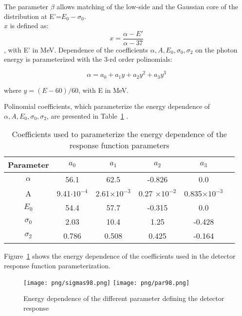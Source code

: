 The parameter $\beta$  allows matching of the low-side and the Gaussian core
of the distribution at E'=$E_0-\sigma_0$.\\
$x$ is defined as:
$$
  x = \frac{\alpha- E'}{\alpha -37} 
$$, with E' in MeV.
Dependence of the coefficients $\alpha, A, E_0, \sigma_0, \sigma_2$ on the photon energy
is parameterized with the 3-rd order polinomials:

\begin{equation}
  \alpha= a_0+a_1y+a_2y^2+a_3y^3
\end{equation}

where $y= (E-60)/60$, with E in MeV.

Polinomial coefficients, which parameterize the energy dependence of
$\alpha, A, E_0, \sigma_0, \sigma_2$, are presented in Table~\ref{tab:param98} .

\begin{table}[!h] \label{tab:param98}
  \begin{center}
    \begin{tabular}{| c | c | c | c | c | c | }
      \hline
      Parameter  & $a_0$              & $a_1$ & $a_2$ & $a_3$ \\ \hline
      $\alpha$   & 56.1               &62.5 & -0.826 & 0.0  \\ \hline
      A          & 9.41$\cdot 10^{-4}$ & 2.61$\times 10^{-3}$ &0.27 $\times 10^{-2}$ &0.835$\times 10^{-3}$   \\ \hline
      $E_0$      & 54.4               & 57.7 & -0.315 &0.0 \\ \hline
      $\sigma_0$ & 2.03               &10.4 &1.25 & -0.428\\ \hline
      $\sigma_2$ & 0.786              & 0.508 & 0.425 & -0.164\\ \hline
    \end{tabular}
  \end{center}
  \caption{Coefficients used to parameterize the energy dependence of the response function parameters}
\end{table}

Figure~\ref{fig:parameters98} shows the energy dependence of the coefficients used
in the detector response function parameterization.

\begin{figure}[!h]
  \begin{center}
    \texttt{[image: png/sigmas98.png]} 
    \texttt{[image: png/par98.png]} 
  \end{center}
  \caption{Energy dependence of the different parameter defining the detector response}
  \label{fig:parameters98}
\end{figure}

